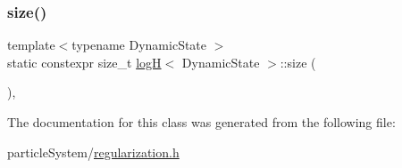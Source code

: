 \subsubsection{\texorpdfstring{size()}{size()}}
{\footnotesize\ttfamily template$<$typename Dynamic\+State $>$ \\
static constexpr size\+\_\+t \mbox{\hyperlink{classlog_h}{logH}}$<$ Dynamic\+State $>$\+::size (\begin{DoxyParamCaption}{ }\end{DoxyParamCaption})\hspace{0.3cm}{\ttfamily [inline]}, {\ttfamily [static]}}



The documentation for this class was generated from the following file\+:\begin{DoxyCompactItemize}
\item 
particle\+System/\mbox{\hyperlink{regularization_8h}{regularization.\+h}}\end{DoxyCompactItemize}

